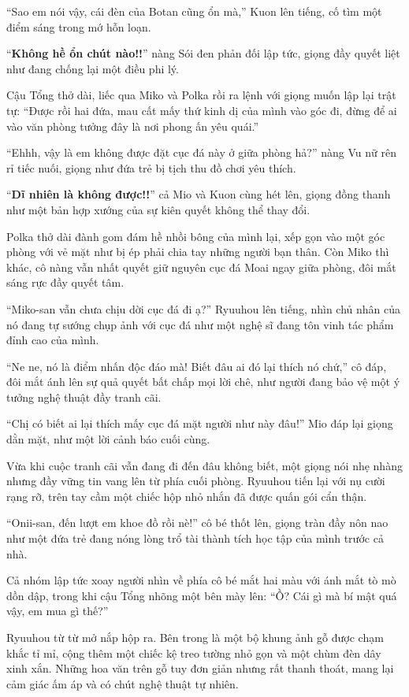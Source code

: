 \documentclass[../main.tex]{subfiles}
\begin{document}
``Sao em nói vậy, cái đèn của Botan cũng ổn mà,'' Kuon lên tiếng, cố tìm một điểm sáng trong mớ hỗn loạn.

``\textbf{Không hề ổn chút nào!!}'' nàng Sói đen phản đối lập tức, giọng đầy quyết liệt như đang chống lại một điều phi lý.

Cậu Tổng thở dài, liếc qua Miko và Polka rồi ra lệnh với giọng muốn lập lại trật tự: ``Được rồi hai đứa, mau cất mấy thứ kinh dị của mình vào góc đi, đừng để ai vào văn phòng tưởng đây là nơi phong ấn yêu quái.''

``Ehhh, vậy là em không được đặt cục đá này ở giữa phòng hả?'' nàng Vu nữ rên rỉ tiếc nuối, giọng như đứa trẻ bị tịch thu đồ chơi yêu thích.

``\textbf{Dĩ nhiên là không được!!}'' cả Mio và Kuon cùng hét lên, giọng đồng thanh như một bản hợp xướng của sự kiên quyết không thể thay đổi.

Polka thở dài đành gom đám hề nhồi bông của mình lại, xếp gọn vào một góc phòng với vẻ mặt như bị ép phải chia tay những người bạn thân. Còn Miko thì khác, cô nàng vẫn nhất quyết giữ nguyên cục đá Moai ngay giữa phòng, đôi mắt sáng rực đầy quyết tâm.

``Miko-san vẫn chưa chịu dời cục đá đi ạ?'' Ryuuhou lên tiếng, nhìn chủ nhân của nó đang tự sướng chụp ảnh với cục đá như một nghệ sĩ đang tôn vinh tác phẩm đỉnh cao của mình.

``Ne ne, nó là điểm nhấn độc đáo mà! Biết đâu ai đó lại thích nó chứ,'' cô đáp, đôi mắt ánh lên sự quả quyết bất chấp mọi lời chê, như người đang bảo vệ một ý tưởng nghệ thuật đầy tranh cãi.

``Chị có biết ai lại thích mấy cục đá mặt người như này đâu!'' Mio đáp lại giọng dằn mặt, như một lời cảnh báo cuối cùng.

Vừa khi cuộc tranh cãi vẫn đang đi đến đâu không biết, một giọng nói nhẹ nhàng nhưng đầy vững tin vang lên từ phía cuối phòng. Ryuuhou tiến lại với nụ cười rạng rỡ, trên tay cầm một chiếc hộp nhỏ nhắn đã được quấn gói cẩn thận.

``Onii-san, đến lượt em khoe đồ rồi nè!'' cô bé thốt lên, giọng tràn đầy nôn nao như một đứa trẻ đang nóng lòng trổ tài thành tích học tập của mình trước cả nhà.

Cả nhóm lập tức xoay người nhìn về phía cô bé mắt hai màu với ánh mắt tò mò dồn dập, trong khi cậu Tổng nhõng một bên mày lên: ``Ồ? Cái gì mà bí mật quá vậy, em mua gì thế?''

Ryuuhou từ từ mở nắp hộp ra. Bên trong là một bộ khung ảnh gỗ được chạm khắc tỉ mỉ, cộng thêm một chiếc kệ treo tường nhỏ gọn và một chùm đèn dây xinh xắn. Những hoa văn trên gỗ tuy đơn giản nhưng rất thanh thoát, mang lại cảm giác ấm áp và có chút nghệ thuật tự nhiên.
\end{document}
